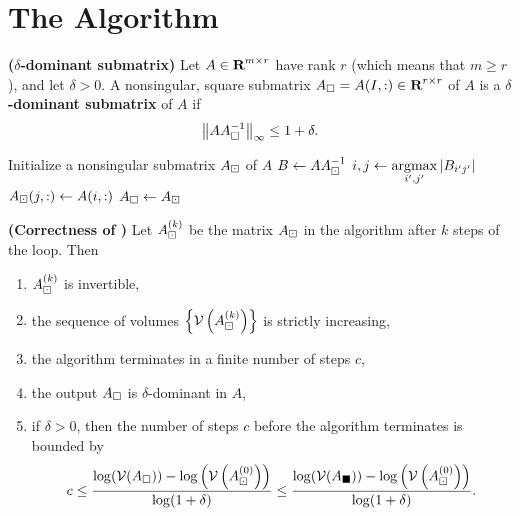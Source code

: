 \documentclass{article}
\begin{document}
	\section{The \maxvol{} Algorithm}
	
	\begin{dfn} \textnormal{\bf($\delta$-dominant submatrix)}
		\label{def:delta_dominant_submatrix}
		Let $A \in \textnormal{\bf R}^{m\times r}$ have rank $r$ (which means that $m \ge r$), and let $\delta > 0$. A nonsingular, square submatrix $A_\square = A(I,:) \in \textnormal{\bf R}^{r\times r}$ of $A$ is a \textbf{$\delta$-dominant submatrix} of $A$ if
		\begin{equation}
			\left\lVert AA_{\square}^{-1} \right\rVert_\infty \le 1 + \delta.
		\end{equation}
	\end{dfn}
	
	\begin{algorithm}
		\caption{\maxvol{}}\label{alg:maxvol}
		Initialize a nonsingular submatrix $A_\boxdot$ of $A$\;
		 {
			$B \gets AA_\boxdot^{-1}$\;
			$i,j\gets \operatorname*{argmax}\limits_{i',j'} |B_{i'j'}|$\;
			 {
				$A_\boxdot(j, :) \gets A(i,:)$\;
			}
		}
		$A_\square \gets A_\boxdot$\;
	\end{algorithm}
	
	\begin{thm} \textnormal{\bf(Correctness of \maxvol{})}
		\label{thm:maxvol_correctness}
		Let $A_\boxdot^{(k)}$ be the matrix $A_\boxdot$ in the \maxvol{} algorithm after $k$ steps of the loop. Then
		\begin{enumerate}
			\item $A_\boxdot^{(k)}$ is invertible,
			\item the sequence of volumes $\left\{\mathcal{V}\left(A_\boxdot^{(k)}\right)\right\}$ is strictly increasing,
			\item the \maxvol{} algorithm terminates in a finite number of steps $c$,
			\item the output $A_\square$ is $\delta$-dominant in $A$,
			\item if $\delta > 0$, then the number of steps $c$ before the algorithm terminates is bounded by
			\begin{equation}
				\label{eq:maxvol_steps_bound}
				c \le \frac{\log(\mathcal{V}(A_\square)) - \log\left(\mathcal{V}\left(A_\boxdot^{(0)}\right)\right)}{\log(1+\delta)} \le \frac{\log(\mathcal{V}(A_\blacksquare)) - \log\left(\mathcal{V}\left(A_\boxdot^{(0)}\right)\right)}{\log(1+\delta)} .
			\end{equation}
		\end{enumerate}
	\end{thm}
	
\end{document}
